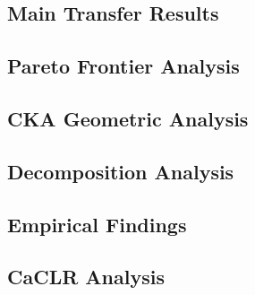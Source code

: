\subsection{Main Transfer Results}
\label{sec:main_results}

\subsection{Pareto Frontier Analysis}
\label{sec:pareto_results}

\subsection{CKA Geometric Analysis}
\label{sec:cka_results}

\subsection{Decomposition Analysis}
\label{sec:decomp_results}

\subsection{Empirical Findings}
\label{sec:empirical}

\subsection{CaCLR Analysis}
\label{sec:caclr_results}
